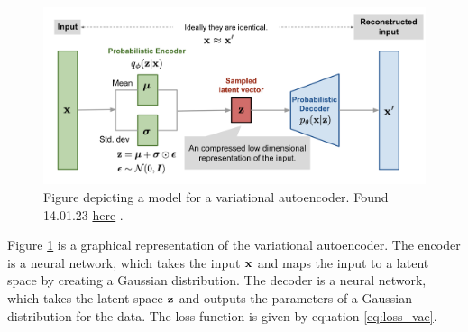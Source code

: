 \begin{figure}[h!]
    \includegraphics[width=\linewidth]{Figures/Machinelearning/vae-gaussian.png}
    \caption{Figure depicting a model for a variational autoencoder. Found 14.01.23 \href{https://lilianweng.github.io/posts/2018-08-12-vae/vae-gaussian.png}{here} \cite{weng2018VAE}. }
    \label{fig:vae}
\end{figure}

Figure \ref{fig:vae} is a graphical representation of the variational autoencoder. The encoder is a neural network, which takes 
the input $\bf{x}$ and maps the input to a latent space by creating a Gaussian distribution. The decoder is a neural network, 
which takes the latent space $\bf{z}$ and outputs the parameters of a Gaussian distribution for the data.
The loss function is given by equation \ref{eq:loss_vae}.